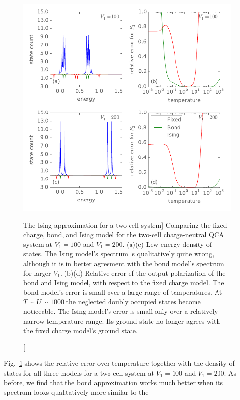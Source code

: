 %
\begin{figure}
  \center
  \includegraphics{ising_approximation2}
  \caption
  [The Ising approximation for a two-cell system]
  {
  Comparing the fixed charge, bond, and Ising model for the two-cell
  charge-neutral QCA system at $V_1 = 100$ and $V_1 = 200$. (a)(c) Low-energy
  density of states. The Ising model's spectrum is qualitatively quite wrong,
  although it is in better agreement with the bond model's spectrum for larger
  $V_1$. (b)(d) Relative error of the output polarization of the bond and Ising
  model, with respect to the fixed charge model. The bond model's error is small
  over a large range of temperatures. At $T \sim U \sim 1000$ the neglected
  doubly occupied states become noticeable. The Ising model's error is small
  only over a relatively narrow temperature range. Its ground state no longer
  agrees with the fixed charge model's ground state.
  }
  \label{fig:ising_approximation2}
\end{figure}
%
Fig.~\ref{fig:ising_approximation2} shows the relative error over temperature
together with the density of states for all three models for a two-cell system
at $V_1 = 100$ and $V_1 = 200$. As before, we find that the bond approximation
works much better when its spectrum looks qualitatively more similar to the
